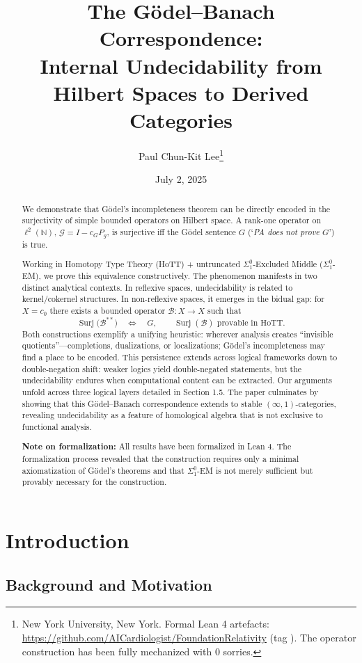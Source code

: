 \documentclass[11pt]{article}
\title{The Gödel--Banach Correspondence:\\
  Internal Undecidability from Hilbert Spaces to Derived Categories}
\author{Paul Chun-Kit Lee\thanks{New York University, New York.  Formal Lean 4 artefacts: \url{https://github.com/AICardiologist/FoundationRelativity}
(tag \leanRepoTag).  The operator construction has been fully mechanized with 0 sorries.  }}
\date{July 2, 2025}
\theoremstyle{definition}
\newcommand{\N}{\mathbb{N}}
\newcommand{\lp}{\ell^{2}(\N)}
\newcommand{\SigOne}{\Sigma^{0}_{\!1}}
\DeclareMathOperator{\Surj}{Surj}
\begin{document}
\maketitle

\begin{abstract}
\noindent
We demonstrate that Gödel's incompleteness theorem can be directly encoded in the surjectivity of simple bounded operators on Hilbert space. A rank-one operator on $\lp$, $\mathcal G = I - c_{G}P_{g}$, is surjective iff the Gödel sentence $G$ (`\emph{PA does not prove $G$}') is true.

Working in Homotopy Type Theory (HoTT) + untruncated $\SigOne$-Excluded Middle ($\SigOne$-EM), we prove this equivalence constructively. The phenomenon manifests in two distinct analytical contexts. In reflexive spaces, undecidability is related to kernel/cokernel structures. In non-reflexive spaces, it emerges in the bidual gap: for $X = c_{0}$ there exists a bounded operator $\mathcal B : X \to X$ such that
\[
  \Surj\bigl(\mathcal B^{**}\bigr) \quad\Longleftrightarrow\quad G,
  \qquad
  \Surj(\mathcal B) \text{ provable in HoTT.}
\]
Both constructions exemplify a unifying heuristic: wherever analysis creates ``invisible quotients''---completions, dualizations, or localizations; Gödel's incompleteness may find a place to be encoded. This persistence extends across logical frameworks down to double-negation shift: weaker logics yield double-negated statements, but the undecidability endures when computational content can be extracted. Our arguments unfold across three logical layers detailed in Section 1.5. The paper culminates by showing that this Gödel--Banach correspondence extends to stable $(\infty,1)$-categories, revealing undecidability as a feature of homological algebra that is not exclusive to functional analysis.

\textbf{Note on formalization:} All results have been formalized in Lean 4. The formalization process revealed that the construction requires only a minimal axiomatization of Gödel's theorems and that $\SigOne$-EM is not merely sufficient but provably necessary for the construction.
\end{abstract}




\section{Introduction}

\subsection{Background and Motivation}
\end{document}
